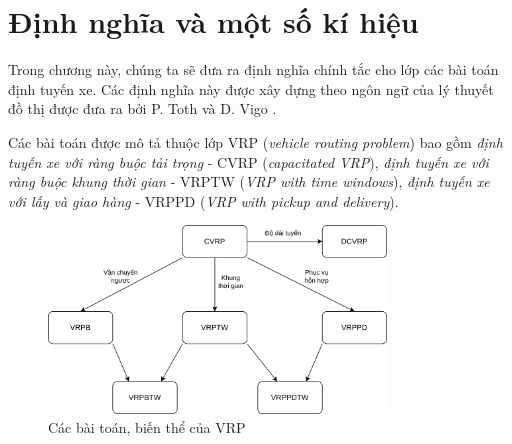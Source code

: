 \chapter{Định nghĩa và một số kí hiệu}
\label{chap:model}

Trong chương này, chúng ta sẽ đưa ra định nghĩa chính tắc cho lớp các bài toán định tuyến xe. Các định nghĩa này được xây dựng theo ngôn ngữ của lý thuyết đồ thị được đưa ra bởi P. Toth và D. Vigo \cite{toth2002vehicle}. 

Các bài toán được mô tả thuộc lớp VRP (\textit{vehicle routing problem}) bao gồm \textit{định tuyến xe với ràng buộc tải trọng} - CVRP (\textit{capacitated VRP}), \textit{định tuyến xe với ràng buộc khung thời gian} - VRPTW (\textit{VRP with time windows}), \textit{định tuyến xe với lấy và giao hàng} - VRPPD (\textit{VRP with pickup and delivery}).

\begin{figure}[H] %
  \centering %
  \includegraphics[width=0.8\textwidth]{figures/vrp.png} 
  \caption{Các bài toán, biến thể của VRP} %
  \label{fig:fg_01}
\end{figure}


